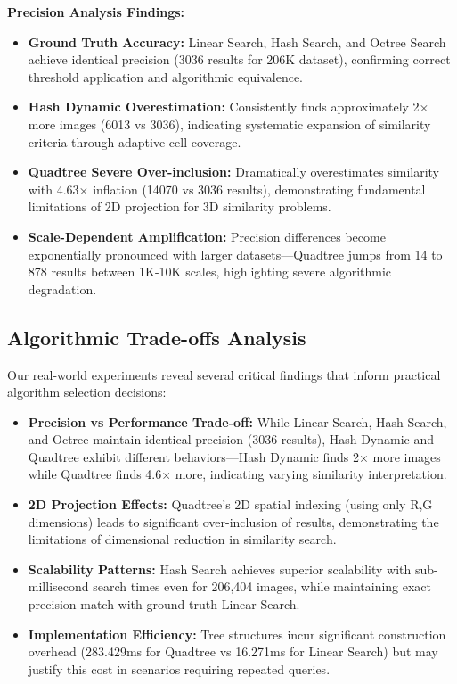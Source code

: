 \documentclass{sbc2023}
\begin{document}
\textbf{Precision Analysis Findings:}

\begin{itemize}
    \item \textbf{Ground Truth Accuracy:} Linear Search, Hash Search, and Octree Search achieve identical precision (3036 results for 206K dataset), confirming correct threshold application and algorithmic equivalence.
    \item \textbf{Hash Dynamic Overestimation:} Consistently finds approximately 2× more images (6013 vs 3036), indicating systematic expansion of similarity criteria through adaptive cell coverage.
    \item \textbf{Quadtree Severe Over-inclusion:} Dramatically overestimates similarity with 4.63× inflation (14070 vs 3036 results), demonstrating fundamental limitations of 2D projection for 3D similarity problems.
    \item \textbf{Scale-Dependent Amplification:} Precision differences become exponentially pronounced with larger datasets—Quadtree jumps from 14 to 878 results between 1K-10K scales, highlighting severe algorithmic degradation.
\end{itemize}

\subsection{Algorithmic Trade-offs Analysis}

Our real-world experiments reveal several critical findings that inform practical algorithm selection decisions:

\begin{itemize}
    \item \textbf{Precision vs Performance Trade-off:} While Linear Search, Hash Search, and Octree maintain identical precision (3036 results), Hash Dynamic and Quadtree exhibit different behaviors—Hash Dynamic finds 2× more images while Quadtree finds 4.6× more, indicating varying similarity interpretation.
    \item \textbf{2D Projection Effects:} Quadtree's 2D spatial indexing (using only R,G dimensions) leads to significant over-inclusion of results, demonstrating the limitations of dimensional reduction in similarity search.
    \item \textbf{Scalability Patterns:} Hash Search achieves superior scalability with sub-millisecond search times even for 206,404 images, while maintaining exact precision match with ground truth Linear Search.
    \item \textbf{Implementation Efficiency:} Tree structures incur significant construction overhead (283.429ms for Quadtree vs 16.271ms for Linear Search) but may justify this cost in scenarios requiring repeated queries.
\end{itemize}
\end{document}
